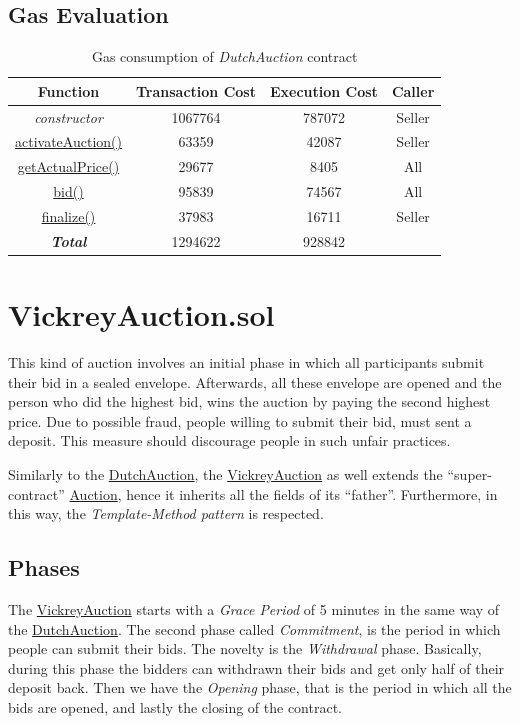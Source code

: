 \documentclass[runningheads,a4paper]{llncs}
\begin{document}
\subsection{Gas Evaluation}

\begin{table}
\setlength{\tabcolsep}{10pt}
\setlength{\abovecaptionskip}{10pt}
\centering
\begin{tabular}{| c | c | c | c |} 
 \hline
 \textbf{Function} & \textbf{Transaction Cost} & \textbf{Execution Cost} & \textbf{Caller} \\
 \hline
 \emph{constructor} & 1067764 & 787072 & Seller \\ 
 \hline
 \url{activateAuction()} & 63359 & 42087 & Seller \\ 
 \hline
 \url{getActualPrice()} & 29677 & 8405 & All \\ 
 \hline
 \url{bid()} & 95839 & 74567 & All \\ 
 \hline
 \url{finalize()} & 37983 & 16711 & Seller \\
 \hline
 \hline
 \hline
 \textbf{\emph{Total}} & 1294622 & 928842 & \\ \hline
\end{tabular}
\caption{Gas consumption of \emph{DutchAuction} contract}
\label{table:1}
\end{table}



\newpage
\section{VickreyAuction.sol}
This kind of auction involves an initial phase in which all participants submit their bid in a sealed envelope. Afterwards, all these envelope are opened and the person who did the highest bid, wins the auction by paying the second highest price. Due to possible fraud, people willing to submit their bid, must sent a deposit. This measure should discourage people in such unfair practices.

Similarly to the \url{DutchAuction}, the \url{VickreyAuction} as well extends the ``super-contract'' \url{Auction}, hence it inherits all the fields of its ``father''. Furthermore, in this way, the \emph{Template-Method pattern} is respected.  


\subsection{Phases}
The \url{VickreyAuction} starts with a \emph{Grace Period} of 5 minutes in the same way of the \url{DutchAuction}. The second phase called \emph{Commitment}, is the period in which people can submit their bids. The novelty is the \emph{Withdrawal} phase. Basically, during this phase the bidders can withdrawn their bids and get only half of their deposit back. Then we have the \emph{Opening} phase, that is the period in which all the bids are opened, and lastly the closing of the contract.
\end{document}
